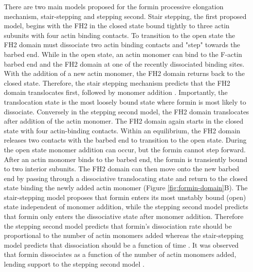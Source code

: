 There are two main models proposed for the formin processive elongation mechanism, stair-stepping and stepping second. Stair stepping, the first proposed model, begins with the FH2 in the closed state bound tightly to three actin subunits with four actin binding contacts. To transition to the open state the FH2 domain must dissociate two actin binding contacts and "step" towards the barbed end. While in the open state, an actin monomer can bind to the F-actin barbed end and the FH2 domain at one of the recently dissociated binding sites. With the addition of a new actin monomer, the FH2 domain returns back to the closed state. Therefore, the stair stepping mechanism predicts that the FH2 domain translocates first, followed by monomer addition \citep{otomo_structural_2005}. Importantly, the translocation state is the most loosely bound state where formin is most likely to dissociate. Conversely in the stepping second model, the FH2 domain translocates after addition of the actin monomer. The FH2 domain again starts in the closed state with four actin-binding contacts. Within an equilibrium, the FH2 domain releases two contacts with the barbed end to transition to the open state. During the open state monomer addition can occur, but the formin cannot step forward. After an actin monomer binds to the barbed end, the formin is transiently bound to two interior subunits. The FH2 domain can then move onto the new barbed end by passing through a dissociative translocating state and return to the closed state binding the newly added actin monomer \citep{paul_role_2008,paul_review_2009} (Figure \ref{fig:formin-domain}B). The stair-stepping model proposes that formin enters its most unstably bound (open) state independent of monomer addition, while the stepping second model predicts that formin only enters the dissociative state after monomer addition. Therefore the stepping second model predicts that formin's dissociation rate should be proportional to the number of actin monomers added whereas the stair-stepping model predicts that dissociation should be a function of time \citep{paul_review_2009}. It was observed that formin dissociates as a function of the number of actin monomers added, lending support to the stepping second model \citep{paul_role_2008}. 

